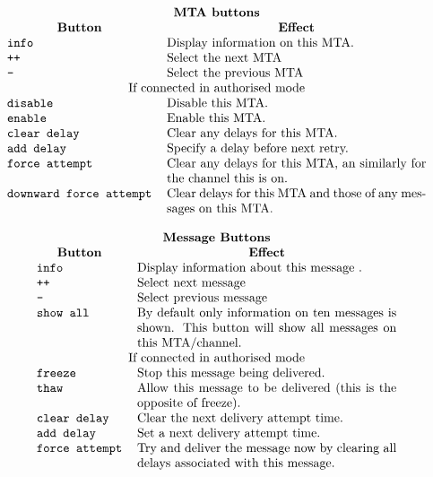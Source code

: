 \[\begin{tabular}{l p{0.6\textwidth}}
	\multicolumn{2}{c}{\bf MTA buttons}\\
	\multicolumn{1}{c}{\bf Button}&
		\multicolumn{1}{c}{\bf Effect}\\	
	\tt info & Display information on this MTA. \\
	\tt ++ & Select the next MTA \\
	\tt -- & Select the previous MTA \\
	\multicolumn{2}{c}{If connected in authorised mode} \\
	\tt disable & Disable this MTA. \\
	\tt enable & Enable this MTA. \\ 
	\tt clear delay & Clear any delays for this MTA. \\
	\tt add delay & Specify a delay before next retry. \\
	\tt force attempt & Clear any delays for this MTA, an
			similarly for the channel this is on. \\
	\tt downward force attempt & Clear delays for this MTA and
			those of any messages on this MTA. \\
\end{tabular}\]

\[\begin{tabular}{l p{0.6\textwidth}}
	\multicolumn{2}{c}{\bf Message Buttons}\\
	\multicolumn{1}{c}{\bf Button}&
		\multicolumn{1}{c}{\bf Effect}\\
	\tt info & Display information about this message .\\
	\tt ++ & Select next message \\
	\tt -- & Select previous message \\
	\tt show all & By default only information on ten messages is
		shown. This button will show all messages on this
		MTA/channel. \\
	\multicolumn{2}{c}{If connected in authorised mode} \\
	\tt freeze & Stop this message being delivered. \\
	\tt thaw & Allow this message to be delivered (this is the
		opposite of freeze). \\
	\tt clear delay & Clear the next delivery attempt time. \\
	\tt add delay & Set a next delivery attempt time. \\	
	\tt force attempt & Try and deliver the message now by clearing
		all delays associated with this message.\\
\end{tabular}\]


